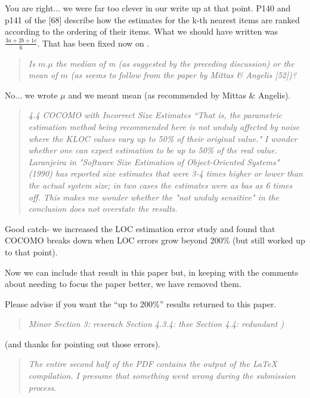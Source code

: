      \noindent You are right... we were far too clever in our write up at that
     point.
     P140 and p141 of the [68] describe how the estimates for the k-th
     nearest items are ranked according to the ordering of their items.
     What we should have written was $\frac{3a + 2b + 1c}{6}$. That has been fixed now on  .

     \begin{quote}{\em     Is $m.\mu$ the median of m (as suggested by the preceding discussion) or the mean of $m$ (as seems to follow from the paper by Mittas \& Angelis [52])?}\end{quote}

\noindent No... we wrote $\mu$ and we meant mean (as recommended by Mittas     \& Angelis).
 

\begin{quote}{\em 4.4 COCOMO with Incorrect Size Estimates ``That
  is, the parametric estimation method being
  recommended here is not unduly affected by noise
  where the KLOC values vary up to 50\% of their
  original value." I wonder whether one can expect
  estimation to be up to 50\% of the real
  value. Laranjeira in "Software Size Estimation of
  Object-Oriented Systems" (1990) has reported size
  estimates that were 3-4 times higher or lower than
  the actual system size; in two cases the estimates
  were as bas as 6 times off. This makes me wonder
  whether the "not unduly sensitive" in the
  conclusion does not overstate the results.}\end{quote}

\noindent Good catch- we increased the LOC estimation error study and found that
COCOMO breaks down when LOC errors grow beyond 200\% (but still worked up
to that point).

  Now we can include that result in this paper but, in keeping with the comments
about needing to focus the paper better, we have removed them.

 Please advise if you want the ``up to 200\%'' results returned to this paper.

\begin{quote}{\em Minor\newline
Section 3: reserach\newline
Section 4.3.4: thse\newline
Section 4.4: redundant )}\end{quote}

\noindent (and thanks for pointing out those errors).


\begin{quote}{\em The entire second half of the PDF contains the output of the LaTeX compilation. I presume that something went wrong during the submission process.}\end{quote}

